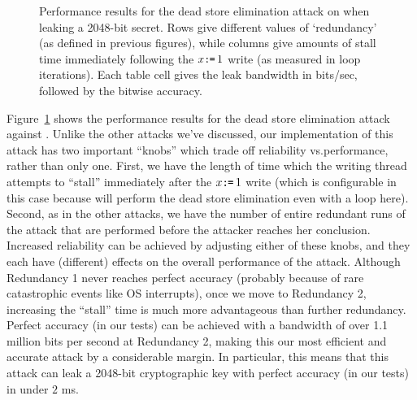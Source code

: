 \begin{figure}
\begin{tabular}{ r | c | c | c | c | c | c }
  \end{tabular}
  \caption{
    Performance results for the dead store elimination attack on {\GCC} when
    leaking a 2048-bit secret.
    Rows give different values of `redundancy' (as defined in previous figures),
    while columns give amounts of stall time immediately following the
    $x\texttt{:}\mkern-1mu\texttt{=}\, 1$ write (as measured in loop iterations).
    Each table cell gives the leak bandwidth in bits/sec, followed by the
    bitwise accuracy.
  }
  \label{fig:gcc-dse-perf}
\end{figure}

Figure~\ref{fig:gcc-dse-perf} shows the performance results for the dead
store elimination attack against {\GCC}.
Unlike the other attacks we've discussed, our implementation of this attack
has two important ``knobs'' which trade off reliability vs.\@ performance,
rather than only one.
First, we have the length of time which the writing thread attempts to
``stall'' immediately after the $x\texttt{:}\mkern-1mu\texttt{=}\, 1$ write (which is configurable in this
case because {\GCC} will perform the dead store elimination even with a loop
here).
Second, as in the other attacks, we have the number of entire redundant runs of
the attack that are performed before the attacker reaches her conclusion.
Increased reliability can be achieved by adjusting either of these knobs,
and they each have (different) effects on the overall performance of the
attack.
Although Redundancy 1 never reaches perfect accuracy (probably because of rare
catastrophic events like OS interrupts), once we move to Redundancy 2,
increasing the ``stall'' time is much more advantageous than further
redundancy.
Perfect accuracy (in our tests) can be achieved with a bandwidth of over 1.1
million bits per second at Redundancy 2, making this our most efficient and
accurate attack by a considerable margin.
In particular, this means that this attack can leak a 2048-bit cryptographic
key with perfect accuracy (in our tests) in under $2$ ms.
